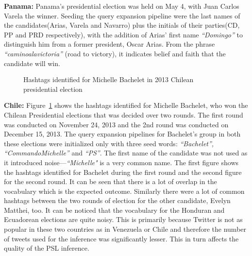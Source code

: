 \noindent
{\bf Panama:}
Panama's presidential election was held on May 4, with Juan Carlos Varela the winner. Seeding the query expansion pipeline were the last names of the candidates(Arias, Varela and Navarro) plus the initials of their parties(CD, PP and PRD respectively), with the addition of Arias' first name \emph{``Domingo''} to distinguish him from a former president, Oscar Arias. From the phrase \emph{``caminoalavictoria''} (road to victory), it indicates belief and faith that the candidate will win.

\begin{figure}
	\centering
	\caption{Hashtags identified for Michelle Bachelet in 2013 Chilean presidential election} 
	\label{fig:bacheletwordCloud}
\end{figure}

\noindent
{\bf Chile:}
Figure~\ref{fig:bacheletwordCloud} shows the hashtags identified for Michelle Bachelet, who won the Chilean Presidential elections that was decided over two rounds.
The first round was conducted on November 24, 2013 and the 2nd round was conducted on December 15, 2013. 
The query expansion pipelines for Bachelet's group in both these elections were initialized only with three seed words: {\emph{``Bachelet'', ``CommandoMichelle''} and \emph{``PS''}}. 
The first name of the candidate was not used as it introduced noise---\emph{``Michelle"} is a very common name.
The first figure shows the hashtags identified for Bachelet during the first round and the second figure for the second round. 
It can be seen that there is a lot of overlap in the vocabulary which is the expected outcome. 
Similarly there were a lot of common hashtags between the two rounds of election for the other candidate, Evelyn Matthei, too.
It can be noticed that the vocabulary for the Honduran and Ecuadorean  elections are quite noisy. 
This is primarily because Twitter is not as popular in these two countries as in Venezuela or Chile and therefore the number of tweets
used for the inference was significantly lesser.
This in turn affects the quality of the PSL inference.


